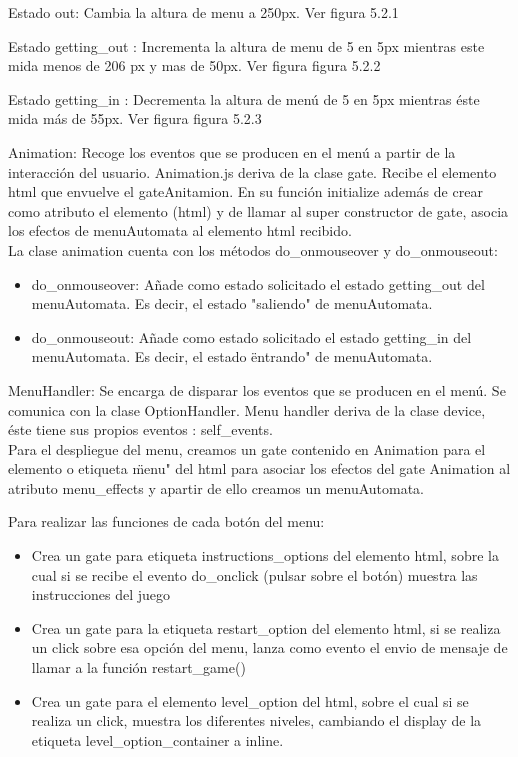 Estado out: Cambia la altura de menu a 250px. Ver figura 5.2.1

Estado getting\_out : Incrementa la altura de menu de 5 en 5px  mientras este mida menos de 206 px y mas de 50px. Ver figura figura 5.2.2

Estado  getting\_in : Decrementa la altura de menú de 5 en 5px  mientras éste mida  más de 55px. Ver figura figura 5.2.3

        
Animation: Recoge los eventos que se producen en el menú a partir de la interacción del usuario. Animation.js deriva de la clase gate.
Recibe el elemento html que envuelve  el gateAnitamion. En su función initialize además de crear como atributo  el elemento (html) y de llamar
al super constructor de gate, asocia los efectos de menuAutomata al elemento html recibido.\\

La clase animation cuenta con los métodos do\_onmouseover y do\_onmouseout:
\begin{itemize}
 \item do\_onmouseover: Añade como estado solicitado el estado getting\_out del menuAutomata.
Es decir, el estado "saliendo" de menuAutomata.

 \item do\_onmouseout: Añade como estado solicitado el estado getting\_in del menuAutomata.
Es decir, el estado \"entrando" de menuAutomata.
\end{itemize}

MenuHandler: Se encarga de disparar los eventos que se producen en el menú. Se comunica con la clase OptionHandler.
Menu handler deriva de la clase device, éste  tiene sus propios eventos : self\_events.\\

Para el despliegue del menu, creamos un gate contenido en Animation para el elemento o etiqueta \"menu" del html para asociar los efectos del 
gate Animation al atributo menu\_effects y apartir de ello creamos un menuAutomata.

Para realizar las funciones de cada botón del menu:
\begin{itemize}
 \item Crea un gate  para etiqueta instructions\_options del elemento html, sobre la cual si se recibe el 
evento do\_onclick (pulsar sobre el botón) muestra las instrucciones del juego

 \item Crea un gate para la etiqueta restart\_option del elemento html, si se realiza un click sobre esa opción del menu, lanza como evento el envio 
de mensaje de llamar a la función restart\_game()

 \item Crea un gate para el elemento level\_option del html, sobre el cual si se realiza un click,
muestra los diferentes niveles, cambiando el display de la etiqueta level\_option\_container a inline.
\end{itemize}

